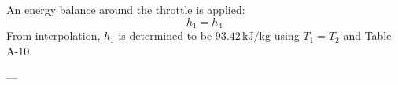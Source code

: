 An energy balance around the throttle is applied:  
\[
h_1 = h_4
\]  
From interpolation, \( h_1 \) is determined to be \( 93.42 \, \text{kJ/kg} \) using \( T_1 = T_2 \) and Table A-10.

---